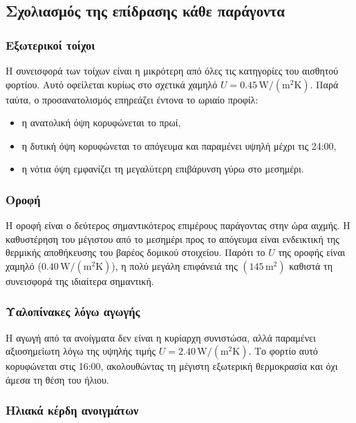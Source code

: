 \documentclass[12pt,a4paper]{article}
\begin{document}
\subsection{Σχολιασμός της επίδρασης κάθε παράγοντα}

\subsubsection{Εξωτερικοί τοίχοι}

Η συνεισφορά των τοίχων είναι η μικρότερη από όλες τις κατηγορίες του αισθητού
φορτίου. Αυτό οφείλεται κυρίως στο σχετικά χαμηλό \(U = 0.45\,\mathrm{W/(m^2K)}\).
Παρά ταύτα, ο προσανατολισμός επηρεάζει έντονα το ωριαίο προφίλ:

\begin{itemize}
\item η ανατολική όψη κορυφώνεται το πρωί,
\item η δυτική όψη κορυφώνεται το απόγευμα και παραμένει υψηλή μέχρι τις 24:00,
\item η νότια όψη εμφανίζει τη μεγαλύτερη επιβάρυνση γύρω στο μεσημέρι.
\end{itemize}

\subsubsection{Οροφή}

Η οροφή είναι ο δεύτερος σημαντικότερος επιμέρους παράγοντας στην ώρα αιχμής. Η
καθυστέρηση του μέγιστου από το μεσημέρι προς το απόγευμα είναι ενδεικτική της
θερμικής αποθήκευσης του βαρέος δομικού στοιχείου. Παρότι το \(U\) της οροφής είναι
χαμηλό (\(0.40\,\mathrm{W/(m^2K)}\)), η πολύ μεγάλη επιφάνειά της
\((145\,\mathrm{m^2})\) καθιστά τη συνεισφορά της ιδιαίτερα σημαντική.

\subsubsection{Υαλοπίνακες λόγω αγωγής}

Η αγωγή από τα ανοίγματα δεν είναι η κυρίαρχη συνιστώσα, αλλά παραμένει αξιοσημείωτη
λόγω της υψηλής τιμής \(U = 2.40\,\mathrm{W/(m^2K)}\). Το φορτίο αυτό κορυφώνεται
στις 16:00, ακολουθώντας τη μέγιστη εξωτερική θερμοκρασία και όχι άμεσα τη θέση του ήλιου.

\subsubsection{Ηλιακά κέρδη ανοιγμάτων}
\end{document}
